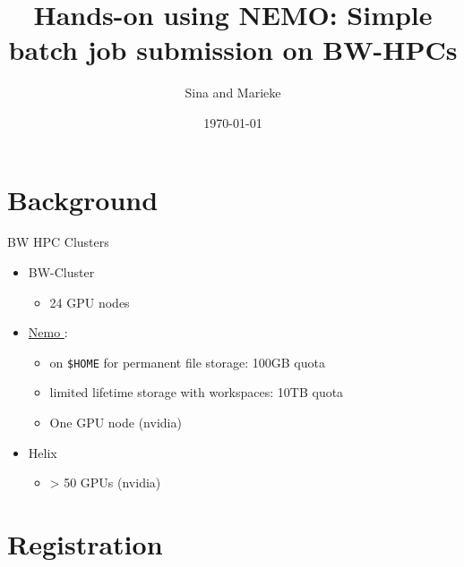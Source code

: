 \documentclass{beamer}
\title[Joint lab meeting]{Hands-on using NEMO: Simple batch job submission on BW-HPCs}
\author{Sina and Marieke}
\institute{}
\date{\today}
\begin{document}
\begin{frame}
  \titlepage
\end{frame}


\section{Background}

\begin{frame}{BW HPC Clusters}

\begin{itemize}
  \item BW-Cluster
  \begin{itemize}
      \item 24 GPU nodes
  \end{itemize}
  \item \href{https://wiki.bwhpc.de/e/NEMO/Hardware#Compute\_and\_Special\_Purpose\_Nodes}{Nemo }:
  \begin{itemize}
      \item on \texttt{\$HOME} for permanent file storage: 100GB quota
      \item limited lifetime storage with workspaces: 10TB quota 
      \item One GPU node (nvidia)
  \end{itemize}
  \item Helix 
  \begin{itemize}
      \item > 50 GPUs (nvidia)
  \end{itemize}
\end{itemize}

\vskip 1cm


\end{frame}

\section{Registration}
\end{document}

